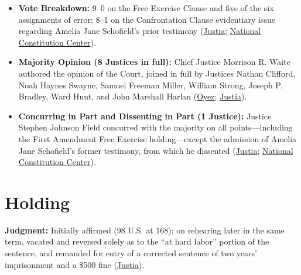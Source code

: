 \documentclass[12pt]{article}
\begin{document}
\begin{itemize}
\item \textbf{Vote Breakdown:} 9--0 on the Free Exercise Clause and five of the six assignments of error; 8--1 on the Confrontation Clause evidentiary issue regarding Amelia Jane Schofield's prior testimony (\href{https://supreme.justia.com/cases/federal/us/98/145/}{Justia}; \href{https://constitutioncenter.org/the-constitution/supreme-court-case-library/reynolds-v-united-states}{National Constitution Center}).
\item \textbf{Majority Opinion (8 Justices in full):} Chief Justice Morrison R. Waite authored the opinion of the Court, joined in full by Justices Nathan Clifford, Noah Haynes Swayne, Samuel Freeman Miller, William Strong, Joseph P. Bradley, Ward Hunt, and John Marshall Harlan (\href{https://www.oyez.org/cases/1850-1900/98us145}{Oyez}; \href{https://supreme.justia.com/cases/federal/us/98/145/}{Justia}).
\item \textbf{Concurring in Part and Dissenting in Part (1 Justice):} Justice Stephen Johnson Field concurred with the majority on all points---including the First Amendment Free Exercise holding---except the admission of Amelia Jane Schofield's former testimony, from which he dissented (\href{https://supreme.justia.com/cases/federal/us/98/145/}{Justia}; \href{https://constitutioncenter.org/the-constitution/supreme-court-case-library/reynolds-v-united-states}{National Constitution Center}).
\end{itemize}

\section{Holding}

\textbf{Judgment:} Initially affirmed (98 U.S. at 168); on rehearing later in the same term, vacated and reversed solely as to the ``at hard labor'' portion of the sentence, and remanded for entry of a corrected sentence of two years' imprisonment and a \$500 fine (\href{https://supreme.justia.com/cases/federal/us/98/145/}{Justia}).
\end{document}
